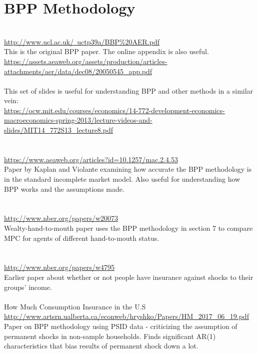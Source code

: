 \documentclass[titlepage,abstract]{econtex}
\begin{document}
\section{BPP Methodology}
\cite{blundell_consumption_2008} \\
\href{url}{http://www.ucl.ac.uk/~uctp39a/BBP\%20AER.pdf} \\
This is the original BPP paper. The online appendix is also useful. \\
\href{url}{https://assets.aeaweb.org/assets/production/articles-attachments/aer/data/dec08/20050545\_app.pdf} \\
\\
This set of slides is useful for understanding BPP and other methods in a similar vein: \\
\href{url}{https://ocw.mit.edu/courses/economics/14-772-development-economics-macroeconomics-spring-2013/lecture-videos-and-slides/MIT14\_772S13\_lecture8.pdf} \\
\\
\cite{kaplan_how_2010} \\
\href{url}{https://www.aeaweb.org/articles?id=10.1257/mac.2.4.53} \\
Paper by Kaplan and Violante examining how accurate the BPP methodology is in the standard incomplete market model. Also useful for understanding how BPP works and the assumptions made.\\
\\
\cite{violante_wealthy_2014} \\
\href{url}{http://www.nber.org/papers/w20073} \\
Wealty-hand-to-mouth paper uses the BPP methodology in section 7 to compare MPC for agents of different hand-to-mouth status. \\
\\
\cite{attanasio_is_1995} \\
\href{url}{http://www.nber.org/papers/w4795} \\
Earlier paper about whether or not people have insurance against shocks to their groups' income.\\
\\
How Much Consumption Insurance in the U.S \\
\href{url}{http://www.artsrn.ualberta.ca/econweb/hryshko/Papers/HM\_2017\_06\_19.pdf} \\
Paper on BPP methodology using PSID data - criticizing the assumption of permanent shocks in non-sample households. Finds significant AR(1) characteristics that bias results of permanent shock down a lot. \\
\end{document}
